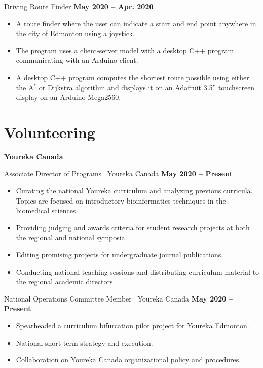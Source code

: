\documentclass{article}
\begin{document}
    Driving Route Finder \hfill \textbf{May 2020 -- Apr. 2020}
    \begin{itemize}
        \item A route finder where the user can indicate a start and end point anywhere in the city of Edmonton using a joystick.
        \item The program uses a client-server model with a desktop C++ program communicating with an Arduino client.
        \item A desktop C++ program computes the shortest route possible using either the A$^*$ or Dijkstra algorithm and displays it on an Adafruit 3.5'' touchscreen display on an Arduino Mega2560.
    \end{itemize}


\section*{\textcolor{my_red}{Volunteering}}
    \textbf{Youreka Canada}

    Associate Director of Programs \textbar\ Youreka Canada \hfill \textbf{May 2020 -- Present}
    \begin{itemize}
        \item Curating the national Youreka curriculum and analyzing previous curricula. Topics are focused on introductory bioinformatics techniques in the biomedical sciences.
        \item Providing judging and awards criteria for student research projects at both the regional and national symposia.
        \item Editing promising projects for undergraduate journal publications.
        \item Conducting national teaching sessions and distributing curriculum material to the regional academic directors.
    \end{itemize}

    National Operations Committee Member \textbar\ Youreka Canada \hfill \textbf{May 2020 -- Present}
    \begin{itemize}
        \item Spearheaded a curriculum bifurcation pilot project for Youreka Edmonton.
        \item National short-term strategy and execution.
        \item Collaboration on Youreka Canada organizational policy and procedures.
    \end{itemize}
\end{document}
